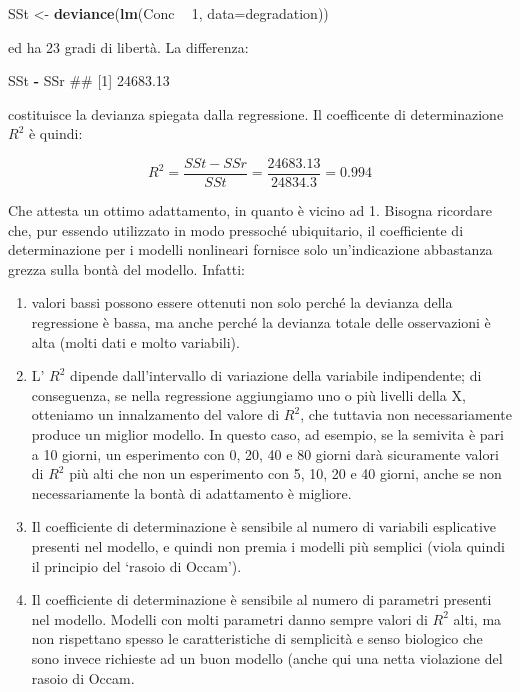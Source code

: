 \documentclass[a4paper,12pt,oneside]{book}
\providecommand{\tightlist}{%
  \setlength{\itemsep}{0pt}\setlength{\parskip}{0pt}}
\newenvironment{Shaded}{\begin{snugshade}}{\end{snugshade}}
\newcommand{\KeywordTok}[1]{\textcolor[rgb]{0.13,0.29,0.53}{\textbf{#1}}}
\newcommand{\DataTypeTok}[1]{\textcolor[rgb]{0.13,0.29,0.53}{#1}}
\newcommand{\DecValTok}[1]{\textcolor[rgb]{0.00,0.00,0.81}{#1}}
\newcommand{\StringTok}[1]{\textcolor[rgb]{0.31,0.60,0.02}{#1}}
\newcommand{\OperatorTok}[1]{\textcolor[rgb]{0.81,0.36,0.00}{\textbf{#1}}}
\newcommand{\NormalTok}[1]{#1}
\theoremstyle{definition}
\theoremstyle{definition}
\theoremstyle{definition}
\theoremstyle{remark}
\begin{document}
\begin{Shaded}
\begin{Highlighting}[]
\NormalTok{SSt <-}\StringTok{ }\KeywordTok{deviance}\NormalTok{(}\KeywordTok{lm}\NormalTok{(Conc }\OperatorTok{~}\StringTok{ }\DecValTok{1}\NormalTok{, }\DataTypeTok{data=}\NormalTok{degradation))}
\end{Highlighting}
\end{Shaded}

ed ha 23 gradi di libertà. La differenza:

\begin{Shaded}
\begin{Highlighting}[]
\NormalTok{SSt }\OperatorTok{-}\StringTok{ }\NormalTok{SSr}
\NormalTok{## [1] 24683.13}
\end{Highlighting}
\end{Shaded}

costituisce la devianza spiegata dalla regressione. Il coefficente di
determinazione \(R^2\) è quindi:

\[R^2 = \frac{SSt - SSr}{SSt} = \frac{24683.13}{24834.3} = 0.994\]

Che attesta un ottimo adattamento, in quanto è vicino ad 1. Bisogna
ricordare che, pur essendo utilizzato in modo pressoché ubiquitario, il
coefficiente di determinazione per i modelli nonlineari fornisce solo
un'indicazione abbastanza grezza sulla bontà del modello. Infatti:

\begin{enumerate}
\def\labelenumi{\arabic{enumi}.}
\tightlist
\item
  valori bassi possono essere ottenuti non solo perché la devianza della
  regressione è bassa, ma anche perché la devianza totale delle
  osservazioni è alta (molti dati e molto variabili).
\item
  L' \(R^2\) dipende dall'intervallo di variazione della variabile
  indipendente; di conseguenza, se nella regressione aggiungiamo uno o
  più livelli della X, otteniamo un innalzamento del valore di \(R^2\),
  che tuttavia non necessariamente produce un miglior modello. In questo
  caso, ad esempio, se la semivita è pari a 10 giorni, un esperimento
  con 0, 20, 40 e 80 giorni darà sicuramente valori di \(R^2\) più alti
  che non un esperimento con 5, 10, 20 e 40 giorni, anche se non
  necessariamente la bontà di adattamento è migliore.
\item
  Il coefficiente di determinazione è sensibile al numero di variabili
  esplicative presenti nel modello, e quindi non premia i modelli più
  semplici (viola quindi il principio del `rasoio di Occam').
\item
  Il coefficiente di determinazione è sensibile al numero di parametri
  presenti nel modello. Modelli con molti parametri danno sempre valori
  di \(R^2\) alti, ma non rispettano spesso le caratteristiche di
  semplicità e senso biologico che sono invece richieste ad un buon
  modello (anche qui una netta violazione del rasoio di Occam.
\end{enumerate}
\end{document}
